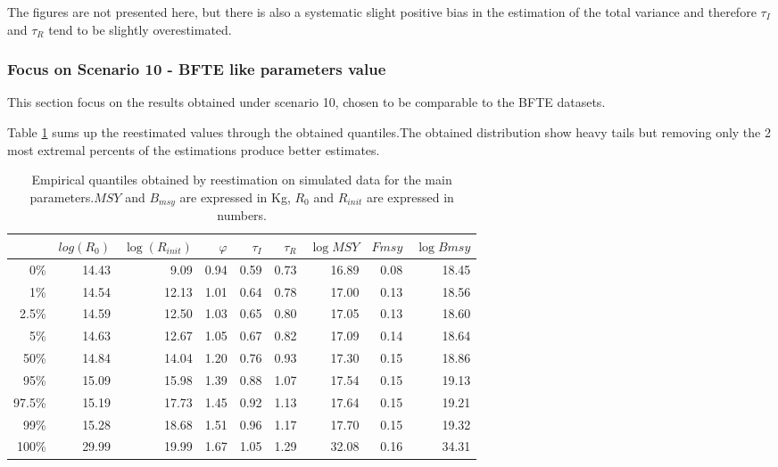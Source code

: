The figures are not presented here, but there is also a systematic slight positive bias in the estimation of the total variance and therefore $\tau_I$ and $\tau_R$ tend to be slightly  overestimated.

\subsubsection{Focus on Scenario 10 - BFTE like parameters value}
This section focus on the results obtained under scenario 10, chosen to be comparable to the BFTE datasets. 

Table \ref{tab:quant} sums up the reestimated values through the obtained quantiles.The obtained distribution show heavy tails but removing only the 2  most extremal percents of the estimations produce  better estimates.


\begin{table}[ht]
\begin{center}
\begin{tabular}{rrrrrrrrr}
  \hline
 & $log(R_0)$ & $\log(R_{init})$ & $\varphi$ & $\tau_I$ & $\tau_R$ & $\log{MSY}$ & $Fmsy$ & $\log{Bmsy}$ \\ 
  \hline
0\% & 14.43 & 9.09 & 0.94 & 0.59 & 0.73 & 16.89 & 0.08 & 18.45 \\ 
  1\% & 14.54 & 12.13 & 1.01 & 0.64 & 0.78 & 17.00 & 0.13 & 18.56 \\ 
  2.5\% & 14.59 & 12.50 & 1.03 & 0.65 & 0.80 & 17.05 & 0.13 & 18.60 \\ 
  5\% & 14.63 & 12.67 & 1.05 & 0.67 & 0.82 & 17.09 & 0.14 & 18.64 \\ 
  50\% & 14.84 & 14.04 & 1.20 & 0.76 & 0.93 & 17.30 & 0.15 & 18.86 \\ 
  95\% & 15.09 & 15.98 & 1.39 & 0.88 & 1.07 & 17.54 & 0.15 & 19.13 \\ 
  97.5\% & 15.19 & 17.73 & 1.45 & 0.92 & 1.13 & 17.64 & 0.15 & 19.21 \\ 
  99\% & 15.28 & 18.68 & 1.51 & 0.96 & 1.17 & 17.70 & 0.15 & 19.32 \\ 
  100\% & 29.99 & 19.99 & 1.67 & 1.05 & 1.29 & 32.08 & 0.16 & 34.31 \\ 
   \hline
\end{tabular}
\end{center}
\caption{Empirical quantiles obtained by reestimation on simulated data for the main parameters.$MSY$ and $B_{msy}$ are expressed in Kg, $R_0$ and $R_{init}$ are expressed in numbers.}
\label{tab:quant}
\end{table}




